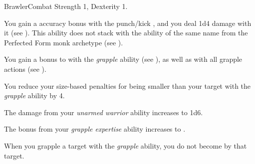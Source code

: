     \begin{feat}{Brawler}{Combat}
        \featpre Strength 1, Dexterity 1.

         You gain a  accuracy bonus with the punch/kick , and you deal 1d4 damage with it (see ).
        This ability does not stack with the ability of the same name from the Perfected Form monk archetype (see ).

         You gain a  bonus to  with the \textit{grapple} ability (see ), as well as with all grapple actions (see ).

         You reduce your size-based penalties for being smaller than your target with the \textit{grapple} ability by 4.

         The damage from your \textit{unarmed warrior} ability increases to 1d6.

         The bonus from your \textit{grapple expertise} ability increases to .

         When you grapple a target with the \textit{grapple} ability, you do not become \grappled by that target.
    \end{feat}

